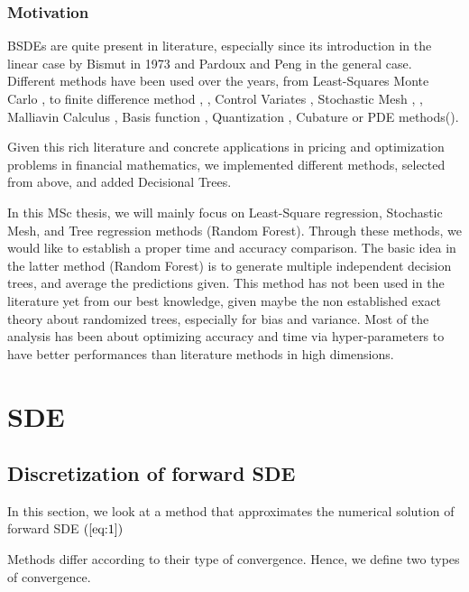 \documentclass[english,11pt,openany]{report}
\theoremstyle{definition}
\theoremstyle{plain}
\theoremstyle{definition}
\begin{document}
\subsection{Motivation}

BSDEs are quite present in literature, especially since its introduction in the linear case by Bismut in 1973 \cite{bismut:1973} and Pardoux and Peng \cite{pardoux:1990} in the general case.  
Different methods have been used over the years, from Least-Squares Monte Carlo \cite{bender:lsmbsde} , to finite difference method \cite{guo:fd}, \cite{milstein:fd}, Control Variates \cite{Gobet:control}, Stochastic Mesh \cite{glasserman:amoption}, \cite{glasserman:broadie}, Malliavin Calculus \cite{Malliavin}, Basis function \cite{Gobet:control}, Quantization \cite{Quantization}, Cubature \cite{Cubature} or PDE methods(\cite{PDE}). 

Given this rich literature and concrete applications in pricing and optimization problems in financial mathematics, we implemented different methods, selected from above, and added Decisional Trees. 

In this MSc thesis, we will mainly focus on Least-Square regression, Stochastic Mesh, and Tree regression methods (Random Forest). 
Through these methods, we would like to establish a proper time and accuracy comparison.
The basic idea in the latter method (Random Forest) is to generate multiple independent decision trees, and average the predictions given. This method has not been used in the literature yet from our best knowledge, given maybe the non established exact theory about randomized trees, especially for bias and variance. 
Most of the analysis has been about optimizing accuracy and time via hyper-parameters to have better performances than literature methods in high dimensions. 



\newpage

\chapter{SDE}

\section{Discretization of forward SDE}


In this section, we look at a method that approximates the numerical solution of forward SDE $(\ref{eq:1})$

Methods differ according to their type of convergence. Hence, we define two types of convergence.
\end{document}

